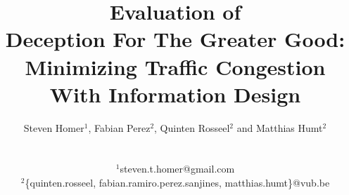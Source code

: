 \title{\large Evaluation of\\\Large Deception For The Greater Good: Minimizing Traffic Congestion With Information Design}
\author{\small Steven Homer$^1$, Fabian Perez$^2$, Quinten Rosseel$^2$ and Matthias Humt$^2$\\
\date{}
\mbox{}\\
\small $^1$steven.t.homer@gmail.com\\
\small $^2$\{quinten.rosseel, fabian.ramiro.perez.sanjines, matthias.humt\}@vub.be}
